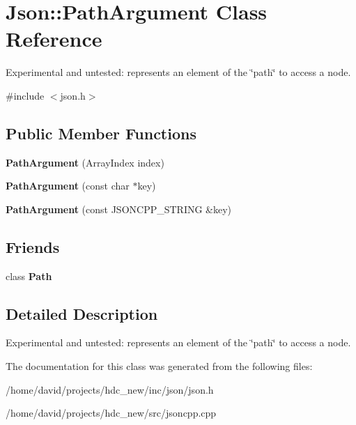 \hypertarget{class_json_1_1_path_argument}{}\section{Json\+:\+:Path\+Argument Class Reference}
\label{class_json_1_1_path_argument}


Experimental and untested\+: represents an element of the \char`\"{}path\char`\"{} to access a node.  




{\ttfamily \#include $<$json.\+h$>$}

\subsection*{Public Member Functions}
\begin{DoxyCompactItemize}
\item 
{\bfseries Path\+Argument} (Array\+Index index)\hypertarget{class_json_1_1_path_argument_a53c5b27143b161301b95fd544c139ecf}{}\label{class_json_1_1_path_argument_a53c5b27143b161301b95fd544c139ecf}

\item 
{\bfseries Path\+Argument} (const char $\ast$key)\hypertarget{class_json_1_1_path_argument_a9690417a8a40e6e49f2acdf6c9281345}{}\label{class_json_1_1_path_argument_a9690417a8a40e6e49f2acdf6c9281345}

\item 
{\bfseries Path\+Argument} (const J\+S\+O\+N\+C\+P\+P\+\_\+\+S\+T\+R\+I\+NG \&key)\hypertarget{class_json_1_1_path_argument_ac15f25452124fbf21218897113015301}{}\label{class_json_1_1_path_argument_ac15f25452124fbf21218897113015301}

\end{DoxyCompactItemize}
\subsection*{Friends}
\begin{DoxyCompactItemize}
\item 
class {\bfseries Path}\hypertarget{class_json_1_1_path_argument_a4877239a6b7f09fbf5a61ca68a49d74c}{}\label{class_json_1_1_path_argument_a4877239a6b7f09fbf5a61ca68a49d74c}

\end{DoxyCompactItemize}


\subsection{Detailed Description}
Experimental and untested\+: represents an element of the \char`\"{}path\char`\"{} to access a node. 

The documentation for this class was generated from the following files\+:\begin{DoxyCompactItemize}
\item 
/home/david/projects/hdc\+\_\+new/inc/json/json.\+h\item 
/home/david/projects/hdc\+\_\+new/src/jsoncpp.\+cpp\end{DoxyCompactItemize}
